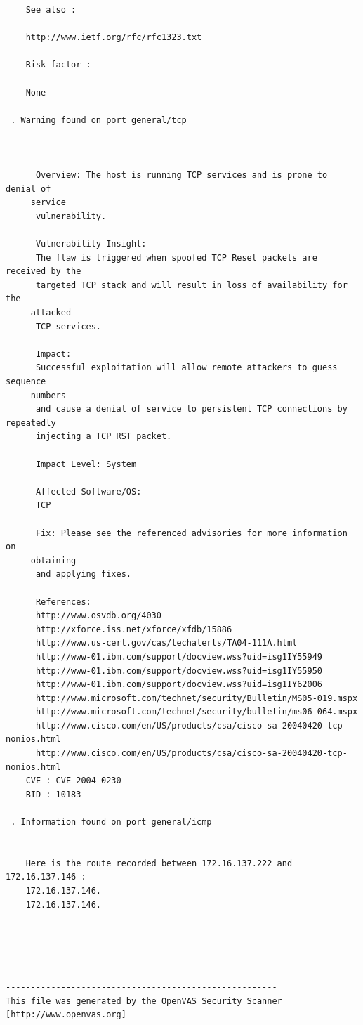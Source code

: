 \documentclass[twoside]{article}
\begin{document}
\begin{lstlisting}
    See also :
    
    http://www.ietf.org/rfc/rfc1323.txt
    
    Risk factor : 
    
    None

 . Warning found on port general/tcp


    
      Overview: The host is running TCP services and is prone to denial of
     service
      vulnerability.
    
      Vulnerability Insight:
      The flaw is triggered when spoofed TCP Reset packets are received by the
      targeted TCP stack and will result in loss of availability for the
     attacked
      TCP services.
    
      Impact:
      Successful exploitation will allow remote attackers to guess sequence
     numbers
      and cause a denial of service to persistent TCP connections by repeatedly
      injecting a TCP RST packet.
    
      Impact Level: System
    
      Affected Software/OS:
      TCP
    
      Fix: Please see the referenced advisories for more information on
     obtaining
      and applying fixes.
    
      References:
      http://www.osvdb.org/4030
      http://xforce.iss.net/xforce/xfdb/15886
      http://www.us-cert.gov/cas/techalerts/TA04-111A.html
      http://www-01.ibm.com/support/docview.wss?uid=isg1IY55949
      http://www-01.ibm.com/support/docview.wss?uid=isg1IY55950
      http://www-01.ibm.com/support/docview.wss?uid=isg1IY62006
      http://www.microsoft.com/technet/security/Bulletin/MS05-019.mspx
      http://www.microsoft.com/technet/security/bulletin/ms06-064.mspx
      http://www.cisco.com/en/US/products/csa/cisco-sa-20040420-tcp-nonios.html
      http://www.cisco.com/en/US/products/csa/cisco-sa-20040420-tcp-nonios.html 
    CVE : CVE-2004-0230
    BID : 10183

 . Information found on port general/icmp


    Here is the route recorded between 172.16.137.222 and 172.16.137.146 :
    172.16.137.146.
    172.16.137.146.
    




------------------------------------------------------
This file was generated by the OpenVAS Security Scanner [http://www.openvas.org]
\end{lstlisting}
\end{document}
